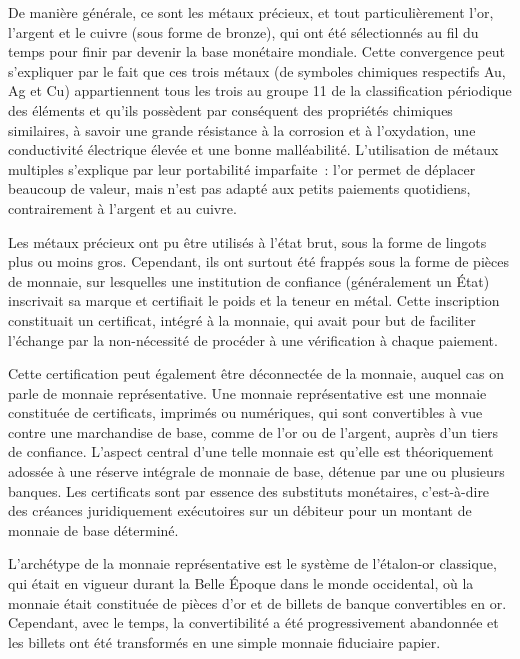 De manière générale, ce sont les métaux précieux, et tout particulièrement l'or, l'argent et le cuivre (sous forme de bronze), qui ont été sélectionnés au fil du temps pour finir par devenir la base monétaire mondiale. Cette convergence peut s'expliquer par le fait que ces trois métaux (de symboles chimiques respectifs Au, Ag et Cu) appartiennent tous les trois au groupe 11 de la classification périodique des éléments et qu'ils possèdent par conséquent des propriétés chimiques similaires, à savoir une grande résistance à la corrosion et à l'oxydation, une conductivité électrique élevée et une bonne malléabilité. L'utilisation de métaux multiples s'explique par leur portabilité imparfaite~: l'or permet de déplacer beaucoup de valeur, mais n'est pas adapté aux petits paiements quotidiens, contrairement à l'argent et au cuivre. %

Les métaux précieux ont pu être utilisés à l'état brut, sous la forme de lingots plus ou moins gros. Cependant, ils ont surtout été frappés sous la forme de pièces de monnaie, sur lesquelles une institution de confiance (généralement un État) inscrivait sa marque et certifiait le poids et la teneur en métal. Cette inscription constituait un certificat, intégré à la monnaie, qui avait pour but de faciliter l'échange par la non-nécessité de procéder à une vérification à chaque paiement.


Cette certification peut également être déconnectée de la monnaie, auquel cas on parle de monnaie représentative. Une monnaie représentative est une monnaie constituée de certificats, imprimés ou numériques, qui sont convertibles à vue contre une marchandise de base, comme de l'or ou de l'argent, auprès d'un tiers de confiance. L'aspect central d'une telle monnaie est qu'elle est théoriquement adossée à une réserve intégrale de monnaie de base, détenue par une ou plusieurs banques. Les certificats sont par essence des substituts monétaires, c'est-à-dire des créances juridiquement exécutoires sur un débiteur pour un montant de monnaie de base déterminé. %

L'archétype de la monnaie représentative est le système de l'étalon-or classique, qui était en vigueur durant la Belle Époque dans le monde occidental, où la monnaie était constituée de pièces d'or et de billets de banque convertibles en or. Cependant, avec le temps, la convertibilité a été progressivement abandonnée et les billets ont été transformés en une simple monnaie fiduciaire papier. %

